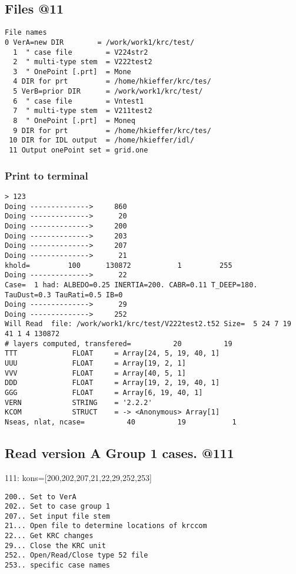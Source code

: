 \documentclass{article}  %
\begin{document}
\subsection{Files  @11} %
\vspace{-3.mm} 
\begin{verbatim}
File names  
0 VerA=new DIR        = /work/work1/krc/test/
  1  " case file        = V224str2
  2  " multi-type stem  = V222test2
  3  " OnePoint [.prt]  = Mone
  4 DIR for prt         = /home/hkieffer/krc/tes/
  5 VerB=prior DIR      = /work/work1/krc/test/
  6  " case file        = Vntest1
  7  " multi-type stem  = V211test2
  8  " OnePoint [.prt]  = Moneq
  9 DIR for prt         = /home/hkieffer/krc/tes/
 10 DIR for IDL output  = /home/hkieffer/idl/
 11 Output onePoint set = grid.one

\end{verbatim}

\subsubsection{Print to terminal } %

\vspace{-3.mm} 
\begin{verbatim}
> 123
Doing -------------->     860
Doing -------------->      20
Doing -------------->     200
Doing -------------->     203
Doing -------------->     207
Doing -------------->      21
khold=         100      130872           1         255
Doing -------------->      22
Case=  1 had: ALBEDO=0.25 INERTIA=200. CABR=0.11 T_DEEP=180. TauDust=0.3 TauRati=0.5 IB=0 
Doing -------------->      29
Doing -------------->     252
Will Read  file: /work/work1/krc/test/V222test2.t52 Size=  5 24 7 19 41 1 4 130872
# layers computed, transfered=          20          19
TTT             FLOAT     = Array[24, 5, 19, 40, 1]
UUU             FLOAT     = Array[19, 2, 1]
VVV             FLOAT     = Array[40, 5, 1]
DDD             FLOAT     = Array[19, 2, 19, 40, 1]
GGG             FLOAT     = Array[6, 19, 40, 1]
VERN            STRING    = '2.2.2'
KCOM            STRUCT    = -> <Anonymous> Array[1]
Nseas, nlat, ncase=          40          19           1
\end{verbatim}


\subsection{Read version A Group 1 cases. @111 \label{a111}} %
111: kons=[200,202,207,21,22,29,252,253]
\vspace{-3.mm} 
\begin{verbatim}
200.. Set to VerA 
202.. Set to case group 1
207.. Set input file stem
21... Open file to determine locations of krccom
22... Get KRC changes
29... Close the KRC unit
252.. Open/Read/Close type 52 file
253.. specific case names
\end{verbatim}
\end{document}
